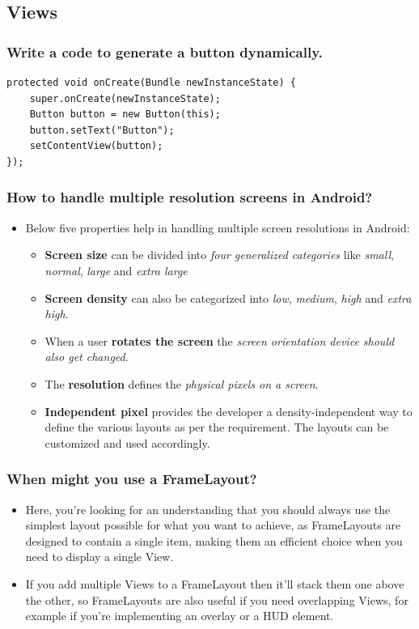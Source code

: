 \documentclass[9pt, b5paper]{article}
\begin{document}
\subsection{Views}
\label{sec-1-7}
\subsubsection{Write a code to generate a button dynamically.}
\label{sec-1-7-1}
\begin{verbatim}
protected void onCreate(Bundle newInstanceState) {
    super.onCreate(newInstanceState);
    Button button = new Button(this);
    button.setText("Button");
    setContentView(button);
});
\end{verbatim}

\subsubsection{How to handle multiple resolution screens in Android?}
\label{sec-1-7-2}
\begin{itemize}
\item Below five properties help in handling multiple screen resolutions in Android:
\begin{itemize}
\item \textbf{Screen size} can be divided into \emph{four generalized categories} like \emph{small}, \emph{normal}, \emph{large} and \emph{extra large}
\item \textbf{Screen density} can also be categorized into \emph{low}, \emph{medium}, \emph{high} and \emph{extra high}.
\item When a user \textbf{rotates the screen} the \emph{screen orientation device should also get changed}.
\item The \textbf{resolution} defines the \emph{physical pixels on a screen}.
\item \textbf{Independent pixel} provides the developer a density-independent way to define the various layouts as per the requirement. The layouts can be customized and used accordingly.
\end{itemize}
\end{itemize}

\subsubsection{When might you use a FrameLayout?}
\label{sec-1-7-3}
\begin{itemize}
\item Here, you're looking for an understanding that you should always use the simplest layout possible for what you want to achieve, as FrameLayouts are designed to contain a single item, making them an efficient choice when you need to display a single View.
\item If you add multiple Views to a FrameLayout then it'll stack them one above the other, so FrameLayouts are also useful if you need overlapping Views, for example if you're implementing an overlay or a HUD element.
\end{itemize}
\end{document}
